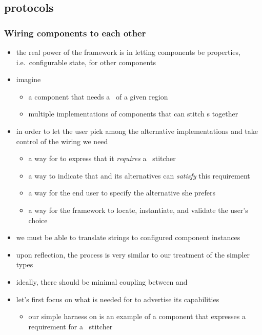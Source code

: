 \subsection{protocols}
\begin{frame}
%
  \frametitle{Wiring components to each other}
%
  \begin{itemize}
%
  \item the real power of the framework is in letting components be properties,
    i.e.~configurable state, for other components
%
  \item imagine
    \begin{itemize}
    \item a component  that needs a \dem\ of a given region
    \item multiple implementations of components that can stitch {\dem}s together
    \end{itemize}
%
  \item in order to let the user pick among the alternative implementations and
    take control of the wiring we need
%
    \begin{itemize}
    \item a way for  to express that it \emph{requires} a \dem\
      stitcher
    \item a way to indicate that  and its alternatives can \emph{satisfy} this
      requirement
    \item a way for the end user to specify the alternative she prefers
    \item a way for the framework to locate, instantiate, and validate the user's choice
    \end{itemize}
%
  \item we must be able to translate strings to configured component instances
%
  \item upon reflection, the process is very similar to our treatment of the simpler types
%
  \item ideally, there should be minimal coupling between  and
%
  \item let's first focus on what is needed for \component{SRTM} to advertise its capabilities
    \begin{itemize}
    \item our simple harness on  is an example of a component that
      expresses a requirement for a \dem\ stitcher
    \end{itemize}
%
  \end{itemize}
%
\end{frame}

